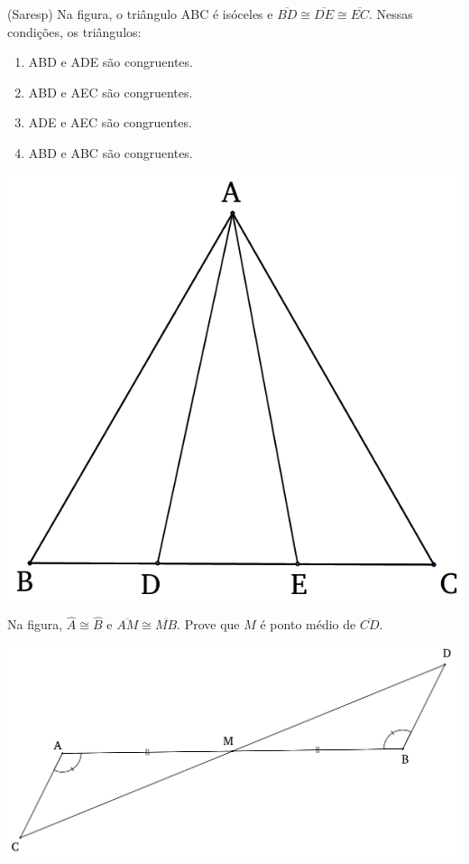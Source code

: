 		 		\item (Saresp) Na figura, o triângulo ABC é isóceles e $\overline{BD} \cong \overline{DE} \cong \overline{EC}$. Nessas condições, os triângulos:
		 		\begin{enumerate}
		 			\item ABD e ADE são congruentes.
		 			\item ABD e AEC são congruentes.
		 			\item ADE e AEC são congruentes.
		 			\item ABD e ABC são congruentes.
		 		\end{enumerate}
		 		\includegraphics[scale=0.4]{figuras/fig21.png}
				
				\item Na figura, $\widehat{A} \cong \widehat{B}$ e $\overline{AM} \cong \overline{MB}$. Prove que $M$ é ponto médio de $\overline{CD}$.
				\begin{flushleft}
				\includegraphics[scale=0.4]{figuras/fig22.png}
				\end{flushleft}
				
			
